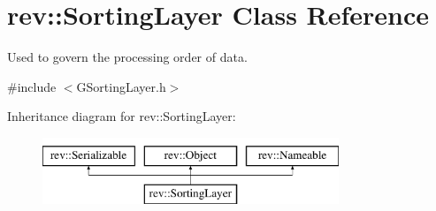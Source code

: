 \hypertarget{structrev_1_1_sorting_layer}{}\section{rev\+::Sorting\+Layer Class Reference}
\label{structrev_1_1_sorting_layer}


Used to govern the processing order of data.  




{\ttfamily \#include $<$G\+Sorting\+Layer.\+h$>$}

Inheritance diagram for rev\+::Sorting\+Layer\+:\begin{figure}[H]
\begin{center}
\leavevmode
\includegraphics[height=2.000000cm]{structrev_1_1_sorting_layer}
\end{center}
\end{figure}
